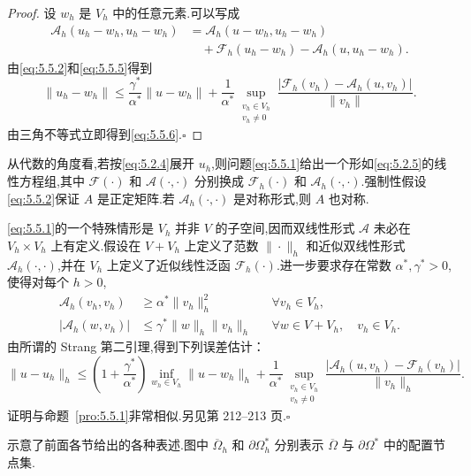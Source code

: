 \begin{proof}
设 \(w_h\) 是 \(V_h\) 中的任意元素.可以写成
\[
  \begin{aligned}
    \mathcal A_h(u_h-w_h,u_h-w_h)
    &=\mathcal A_h(u-w_h,u_h-w_h)\\
    &\quad+\mathcal F_h(u_h-w_h)-\mathcal A_h(u,u_h-w_h).
  \end{aligned}
\]
由\eqref{eq:5.5.2}和\eqref{eq:5.5.5}得到
\[
  \|u_h-w_h\|\le\frac{\gamma^*}{\alpha^*}\|u-w_h\|
    +\frac1{\alpha^*}\sup_{\substack{v_h\in V_h\\v_h\ne0}}
        \frac{|\mathcal F_h(v_h)-\mathcal A_h(u,v_h)|}{\|v_h\|}.
\]
由三角不等式立即得到\eqref{eq:5.5.6}.\hfill\(\square\)
\end{proof}

从代数的角度看,若按\eqref{eq:5.2.4}展开 \(u_h\),则问题\eqref{eq:5.5.1}给出一个形如\eqref{eq:5.2.5}的线性方程组,其中 \(\mathcal F(\cdot)\) 和 \(\mathcal A(\cdot,\cdot)\) 分别换成 \(\mathcal F_h(\cdot)\) 和 \(\mathcal A_h(\cdot,\cdot)\).强制性假设\eqref{eq:5.5.2}保证 \(A\) 是正定矩阵.若 \(\mathcal A_h(\cdot,\cdot)\) 是对称形式,则 \(A\) 也对称.

\begin{note}
\eqref{eq:5.5.1}的一个特殊情形是 \(V_h\) 并非 \(V\) 的子空间,因而双线性形式 \(\mathcal A\) 未必在 \(V_h\times V_h\) 上有定义.假设在 \(V+V_h\) 上定义了范数 \(\|\cdot\|_h\) 和近似双线性形式 \(\mathcal A_h(\cdot,\cdot)\),并在 \(V_h\) 上定义了近似线性泛函 \(\mathcal F_h(\cdot)\).进一步要求存在常数 \(\alpha^*,\gamma^*>0\),使得对每个 \(h>0\),
\[
  \begin{aligned}
    \mathcal A_h(v_h,v_h)&\ge\alpha^*\|v_h\|_h^2
      &&\forall v_h\in V_h,\\
    |\mathcal A_h(w,v_h)|&\le\gamma^*\|w\|_h\|v_h\|_h
      &&\forall w\in V+V_h,\quad v_h\in V_h.
  \end{aligned}
\]
由所谓的 Strang 第二引理,得到下列误差估计：
\[
  \|u-u_h\|_h\le
     \left(1+\frac{\gamma^*}{\alpha^*}\right)\inf_{w_h\in V_h}\|u-w_h\|_h
    +\frac1{\alpha^*}\sup_{\substack{v_h\in V_h\\v_h\ne0}}
          \frac{|\mathcal A_h(u,v_h)-\mathcal F_h(v_h)|}{\|v_h\|_h}.
\]
证明与命题~\ref{pro:5.5.1}非常相似.另见第 212–213 页.\hfill\(\square\)
\end{note}

示意了前面各节给出的各种表述.图中 \(\overline\Omega_h\) 和 \(\partial\Omega_h^*\) 分别表示 \(\overline\Omega\) 与 \(\partial\Omega^*\) 中的配置节点集.

